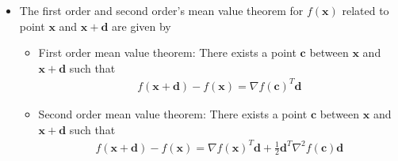 \begin{itemize}
    \item [(d)] The first order and second order's mean value theorem for $f(\mathbf{x})$ related to point $\mathbf{x}$ and $\mathbf{x}+\mathbf{d}$ are given by
    \begin{itemize}
        \item First order mean value theorem: There exists a point $\mathbf{c}$ between $\mathbf{x}$ and $\mathbf{x}+\mathbf{d}$ such that
        \begin{align*}
            f(\mathbf{x}+\mathbf{d}) - f(\mathbf{x}) = \nabla f(\mathbf{c})^T \mathbf{d}
        \end{align*}
        \item Second order mean value theorem: There exists a point $\mathbf{c}$ between $\mathbf{x}$ and $\mathbf{x}+\mathbf{d}$ such that
        \begin{align*}
            f(\mathbf{x}+\mathbf{d}) - f(\mathbf{x}) = \nabla f(\mathbf{x})^T \mathbf{d} + \frac{1}{2}\mathbf{d}^T \nabla^2 f(\mathbf{c})\mathbf{d}
        \end{align*}
    \end{itemize}
\end{itemize}






\newpage